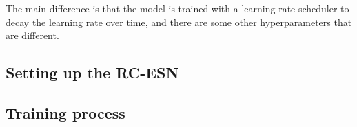 \documentclass[11pt]{article}
\begin{document}
The main difference is that the model is trained with a learning rate scheduler to decay the learning rate over time, and there are some other hyperparameters that are different. 

\subsection{Setting up the RC-ESN}

\subsection{Training process}
\end{document}
